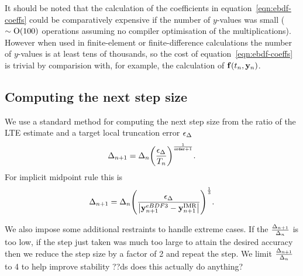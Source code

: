 It should be noted that the calculation of the coefficients in equation~\eqref{eqn:ebdf-coeffs} could be comparatively expensive if the number of $y$-values was small ($\sim \text{O}(100)$ operations assuming no compiler optimisation of the multiplications).
However when used in finite-element or finite-difference calculations the number of $y$-values is at least tens of thousands, so the cost of equation~\eqref{eqn:ebdf-coeffs} is trivial by comparision with, for example, the calculation of ${\mathbf{f}{\left( t_n, \mathbf{y}_n \right)}}$.


\subsection{Computing the next step size}

We use a standard method \cite[pg.268]{GreshoSani} for computing the next step size from the ratio of the LTE estimate and a target local truncation error $\epsilon_{\Delta_{}}$
\begin{equation}
\Delta_{n+1} = \Delta_{n} {\left(  \frac{\epsilon_{\Delta_{}}}{T_n}  \right)}^{\frac{1}{\texttt{order}+1}}.
\end{equation}
For implicit midpoint rule this is
\begin{equation}
  \Delta_{n+1} = \Delta_{n} {\left(  \frac{\epsilon_{\Delta_{}}}{\left|{\mathbf{y}_{n+1}^{eBDF3} - \mathbf{y}_{n+1}^{\text{IMR}}} \right|}  \right)}^{\frac{1}{3}}.
  \label{eq:next-step-dt}
\end{equation}

We also impose some additional restraints to handle extreme cases.
If the $\frac{\Delta_{n+1}}{\Delta_{n}}$ is too low, \ie if the step just taken was much too large to attain the desired accuracy then we reduce the step size by a factor of 2 and repeat the step.
We limit $\frac{\Delta_{n+1}}{\Delta_{n}}$ to 4 to help improve stability ??ds does this actually do anything?






